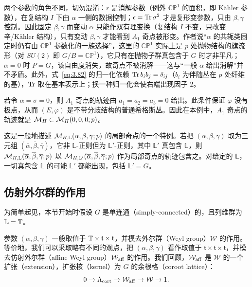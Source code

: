 \begin{yizhu}[易错点]
两个参数的角色不同，切勿混淆：$r$ 是消解参数（例外 $\mathbb{CP}^1$ 的面积，即 Kähler 参数），在复结构 $I$ 下由 $\alpha$ 一侧的数据控制；$\epsilon={\rm Tr}\,\sigma^2$ 才是复形变参数，只由 $\beta,\gamma$ 控制。因此固定 $\beta,\gamma$ 而变动 $\alpha$ 只能作双有理变换（复结构 $I$ 不变，只改变辛/Kähler 结构），只有变动 $\beta,\gamma$ 才能看到 $A_1$ 奇点被形变。作者说“$\alpha$ 的共轭类固定时仍有由 $\mathbb{CP}^1$ 参数化的一族选择”，这里的 $\mathbb{CP}^1$ 实际上是 $p$ 处抛物结构的旗流形（对 $SU(2)$ 即 $G/B=\mathbb{CP}^1$），它只有在抛物子群真包含于 $G$ 时才非平凡；$\alpha=0$ 时 $P=G$，该自由度消失，故奇点不被消解——这与“一般 $\alpha$ 给出消解”并不矛盾。此外，式~\eqref{eq:3.82} 的归一化依赖 ${\rm Tr}\,b_ib_j=\delta_{ij}$（$b_i$ 为伴随丛在 $p$ 处纤维的基），${\rm Tr}$ 取在基本表示上；换一种归一化会使右端出现因子 $2$。
\end{yizhu}

若令 $\alpha=\sigma=0$，则 $A_1$ 奇点的轨迹由 $a_1=a_2=a_3=0$ 给出。此条件保证 $\varphi$ 没有极点，从而 $(E,\varphi)$ 是不带分歧结构的普通希格斯丛。因此在本例中，$A_1$ 奇点的轨迹就是 ${\mathcal{M}}_H\subset {\mathcal{M}}_H(0,0,0;p)$。

这是一般地描述 ${\mathcal{M}}_{H,\mathbb{L}}(\alpha,\beta,\gamma;p)$ 的局部奇点的一个特例。若把 $(\alpha,\beta,\gamma)$ 取为三元组 $(\bar\alpha,\bar\beta,\bar\gamma)$，它非 $\mathbb{L}$-正则但为 $\mathbb{L}'$-正则，其中 $\mathbb{L}'$ 真包含 $\mathbb{L}$，则 ${\mathcal{M}}_{H,\mathbb{L}}(\overline\alpha,\overline\beta,\overline\gamma;p)$ 以 ${\mathcal{M}}_{H,\mathbb{L}'}(\overline\alpha,\overline\beta,\overline\gamma;p)$ 作为局部奇点的轨迹包含之。对给定的 $\mathbb{L}$，一切真包含 $\mathbb{L}$ 的可能 $\mathbb{L}'$ 都能出现，包括 $\mathbb{L}'=G$。

\subsection{仿射外尔群的作用}

\label{sec:3.7}

为简单起见，本节开始时假设 $G$ 是单连通（simply-connected）的，且列维群为 $\mathbb{L}={\mathbb{T}}$。

参数 $(\alpha,\beta,\gamma)$ 一般取值于 ${\mathbb{T}}\times \mathfrak t\times \mathfrak t$，并模去外尔群（Weyl group）${\mathcal W}$ 的作用。等价地，我们可以采取略有不同的观点，把 $(\alpha,\beta,\gamma)$ 看作取值于 $\mathfrak t\times \mathfrak t\times \mathfrak t$，并模去仿射外尔群（affine Weyl group）${\mathcal W}_{\rm aff}$ 的作用。我们回顾，${\mathcal W}_{\rm aff}$ 是 ${\mathcal W}$ 的一个扩张（extension），扩张核（kernel）为 $G$ 的余根格（coroot lattice）：
\setcounter{equation}{82}
\begin{equation}\label{eq:3.83}
  0\to \Lambda_{\rm cort}\to{\mathcal W}_{\rm aff}\to {\mathcal W}\to 1.
\end{equation}

